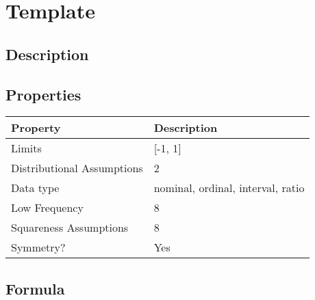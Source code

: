 \documentclass[11pt]{article}
\begin{document}
\section{Template} %
\subsection{Description}

\subsection{Properties}
\begin{tabular}{| l || l |}
    \hline
    {\bf Property} & {\bf Description} \\
    \hline
    Limits & [-1, 1] \\ \hline

    Distributional Assumptions& 2 \\ \hline

    Data type & nominal, ordinal, interval, ratio \\ \hline

    Low Frequency & 8 \\ \hline

    Squareness Assumptions & 8 \\ \hline
    
    Symmetry? & Yes \\ \hline

\end{tabular}


\subsection{Formula}
\end{document}
